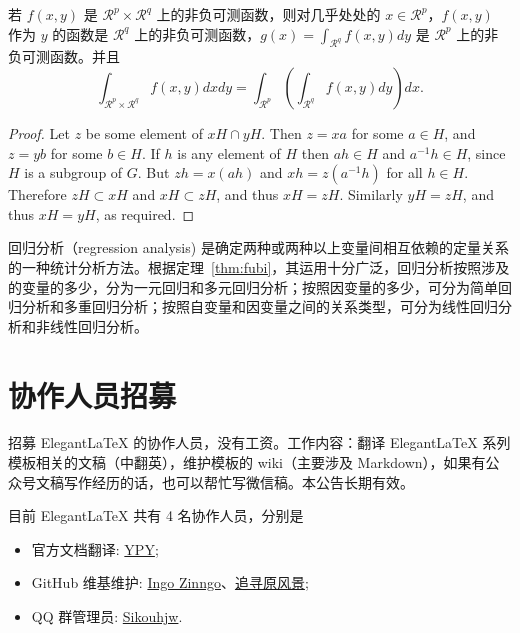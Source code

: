 \documentclass[cn,geye,blue,14pt,normal]{elegantnote}
\begin{document}
\begin{theorem}[Fubini 定理]\label{thm:fubi}
  若 $f(x,y)$ 是 $\mathcal{R}^p\times\mathcal{R}^q$ 上的非负可测函数，则对几乎处处的 $x\in \mathcal{R}^p$，$f(x,y)$ 作为 $y$ 的函数是 $\mathcal{R}^q$ 上的非负可测函数，$g(x)=\int_{\mathcal{R}^q}f(x,y) dy$ 是 $\mathcal{R}^p$ 上的非负可测函数。并且
  \begin{equation}\label{eq:461}
    \int_{\mathcal{R}^p\times\mathcal{R}^q} f(x,y) dxdy=\int_{\mathcal{R}^p}\left(\int_{\mathcal{R}^q}f(x,y)dy\right)dx.
  \end{equation}
\end{theorem}

\begin{proof}
  Let $z$ be some element of $xH \cap yH$.  Then $z = xa$ for some $a \in H$, and $z = yb$ for some $b \in H$. If $h$ is any element of $H$ then $ah \in H$ and $a^{-1}h \in H$, since $H$ is a subgroup of $G$. But $zh = x(ah)$ and $xh = z(a^{-1}h)$ for all $h \in H$. Therefore $zH \subset xH$ and $xH \subset zH$, and thus $xH = zH$.  Similarly $yH = zH$, and thus $xH = yH$, as required.
\end{proof}


回归分析（regression analysis) 是确定两种或两种以上变量间相互依赖的定量关系的一种统计分析方法。根据定理~\ref{thm:fubi}，其运用十分广泛，回归分析按照涉及的变量的多少，分为一元回归和多元回归分析；按照因变量的多少，可分为简单回归分析和多重回归分析；按照自变量和因变量之间的关系类型，可分为线性回归分析和非线性回归分析。


\section{协作人员招募}

招募 Elegant\LaTeX{} 的协作人员，没有工资。工作内容：翻译 Elegant\LaTeX{} 系列模板相关的文稿（中翻英），维护模板的 wiki（主要涉及 Markdown），如果有公众号文稿写作经历的话，也可以帮忙写微信稿。本公告长期有效。

目前 ElegantLaTeX 共有 4 名协作人员，分别是
\begin{itemize}
  \item 官方文档翻译: \href{https://github.com/peggy2006xzyz}{YPY};
  \item GitHub 维基维护: \href{https://github.com/izinngo}{Ingo Zinngo}、\href{https://github.com/xiaohao890809}{追寻原风景};
  \item QQ 群管理员: \href{https://github.com/sikouhjw}{Sikouhjw}.
\end{itemize}
\end{document}
